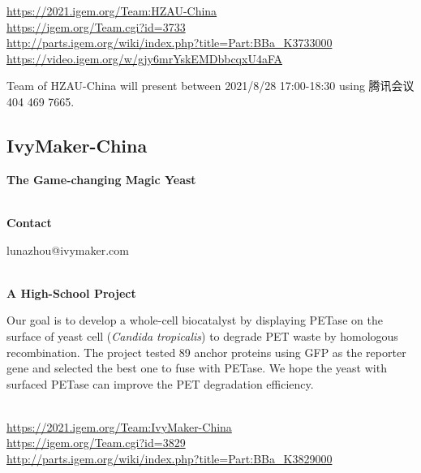 \url{https://2021.igem.org/Team:HZAU-China }\\
\url{https://igem.org/Team.cgi?id=3733 }\\
\url{http://parts.igem.org/wiki/index.php?title=Part:BBa_K3733000 }\\
\url{https://video.igem.org/w/gjy6mrYskEMDbbcqxU4aFA }\\

\vfill{}









Team of HZAU-China will present between        2021/8/28 17:00-18:30 using 腾讯会议 404 469 7665.
\newpage


\subsection{\textcolor{Blu}{ IvyMaker-China } }
\vspace{5mm}
\begin{center}
\large{
  \textbf{ The Game-changing Magic Yeast }\\

}
\end{center}
\textbf{\\Contact}

  lunazhou@ivymaker.com


\textbf{\\A High-School Project\\}\begin{spacing}{1.5}

Our goal is to develop a whole-cell biocatalyst by displaying PETase on the surface of yeast cell (\textit{Candida tropicalis}) to degrade PET waste by homologous recombination. The project tested 89 anchor proteins using GFP as the reporter gene and selected the best one to fuse with PETase. We hope the yeast with surfaced PETase can improve the PET degradation efficiency.\end{spacing}
\\

\url{https://2021.igem.org/Team:IvyMaker-China }\\
\url{https://igem.org/Team.cgi?id=3829 }\\
\url{http://parts.igem.org/wiki/index.php?title=Part:BBa_K3829000 }\\


\vfill{}









